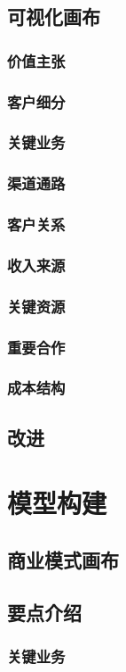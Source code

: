 \documentclass[a4paper,12pt]{article}
\begin{document}
\subsection{可视化画布}
\subsubsection{价值主张}
\subsubsection{客户细分}
\subsubsection{关键业务}
\subsubsection{渠道通路}
\subsubsection{客户关系}
\subsubsection{收入来源}
\subsubsection{关键资源}
\subsubsection{重要合作}
\subsubsection{成本结构}
\subsection{改进}
\section{模型构建}
\subsection{商业模式画布}
\subsection{要点介绍}
\subsubsection{关键业务}
\end{document}
